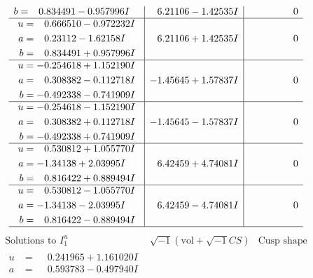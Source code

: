 \documentclass[1p]{elsarticle_modified}
\theoremstyle{definition}
\newcommand{\I}{\sqrt{-1}}
\begin{document}
$$\begin{array}{c|c|c}
\begin{aligned}
b &= \phantom{-}0.834491 - 0.957996 I\end{aligned}
 & \phantom{-}6.21106 - 1.42535 I & \phantom{-0.000000 } 0 \\ \hline\begin{aligned}
u &= \phantom{-}0.666510 - 0.972232 I \\
a &= \phantom{-}0.23112 - 1.62158 I \\
b &= \phantom{-}0.834491 + 0.957996 I\end{aligned}
 & \phantom{-}6.21106 + 1.42535 I & \phantom{-0.000000 } 0 \\ \hline\begin{aligned}
u &= -0.254618 + 1.152190 I \\
a &= \phantom{-}0.308382 - 0.112718 I \\
b &= -0.492338 - 0.741909 I\end{aligned}
 & -1.45645 + 1.57837 I & \phantom{-0.000000 } 0 \\ \hline\begin{aligned}
u &= -0.254618 - 1.152190 I \\
a &= \phantom{-}0.308382 + 0.112718 I \\
b &= -0.492338 + 0.741909 I\end{aligned}
 & -1.45645 - 1.57837 I & \phantom{-0.000000 } 0 \\ \hline\begin{aligned}
u &= \phantom{-}0.530812 + 1.055770 I \\
a &= -1.34138 + 2.03995 I \\
b &= \phantom{-}0.816422 + 0.889494 I\end{aligned}
 & \phantom{-}6.42459 + 4.74081 I & \phantom{-0.000000 } 0 \\ \hline\begin{aligned}
u &= \phantom{-}0.530812 - 1.055770 I \\
a &= -1.34138 - 2.03995 I \\
b &= \phantom{-}0.816422 - 0.889494 I\end{aligned}
 & \phantom{-}6.42459 - 4.74081 I & \phantom{-0.000000 } 0\\
 \hline 
 \end{array}$$\newpage$$\begin{array}{c|c|c}  
\text{Solutions to }I^u_{1}& \I (\text{vol} + \sqrt{-1}CS) & \text{Cusp shape}\\
 \hline 
\begin{aligned}
u &= \phantom{-}0.241965 + 1.161020 I \\
a &= \phantom{-}0.593783 - 0.497940 I \\

\end{aligned}
\end{array}$$
\end{document}
